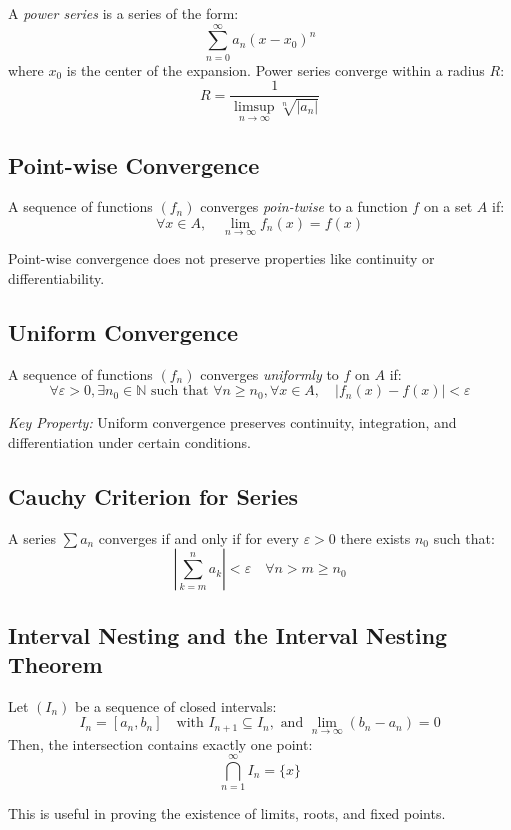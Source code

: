 A \emph{power series} is a series of the form:
\[
\sum_{n=0}^{\infty} a_n (x - x_0)^n
\]
where \(x_0\) is the center of the expansion. Power series converge within a radius \(R\):
\[
R = \frac{1}{\limsup\limits_{n \to \infty} \sqrt[n]{|a_n|}}
\]

\subsection{Point-wise Convergence}

A sequence of functions \((f_n)\) converges \emph{poin-twise} to a function \(f\) on a set \(A\) if:
\[
\forall x \in A, \quad \lim_{n \to \infty} f_n(x) = f(x)
\]

Point-wise convergence does not preserve properties like continuity or differentiability.

\subsection{Uniform Convergence}

A sequence of functions \((f_n)\) converges \emph{uniformly} to \(f\) on \(A\) if:
\[
\forall \varepsilon > 0, \exists n_0 \in \mathbb{N} \text{ such that } \forall n \ge n_0, \forall x \in A, \quad |f_n(x) - f(x)| < \varepsilon
\]

\emph{Key Property:} Uniform convergence preserves continuity, integration, and differentiation under certain conditions.

\subsection{Cauchy Criterion for Series}

A series \(\sum a_n\) converges if and only if for every \(\varepsilon > 0\) there exists \(n_0\) such that:
\[
\left| \sum_{k = m}^{n} a_k \right| < \varepsilon \quad \forall n > m \ge n_0
\]

\subsection{Interval Nesting and the Interval Nesting Theorem}

Let \((I_n)\) be a sequence of closed intervals:
\[
I_n = [a_n, b_n] \quad \text{with } I_{n+1} \subseteq I_n, \text{ and } \lim_{n \to \infty} (b_n - a_n) = 0
\]
Then, the intersection contains exactly one point:
\[
\bigcap_{n=1}^{\infty} I_n = \{x\}
\]

This is useful in proving the existence of limits, roots, and fixed points.

